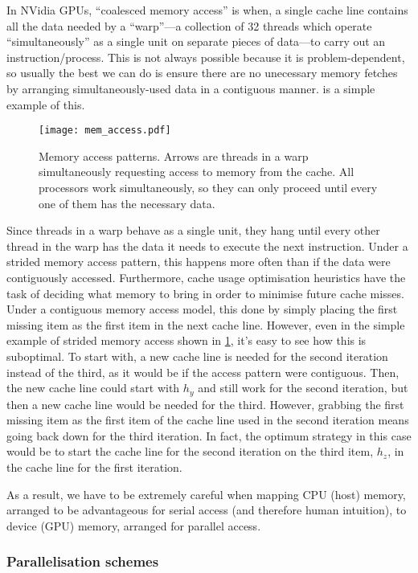 In NVidia GPUs, ``coalesced memory access'' is when, a single cache line contains all the data needed by a ``warp''---a collection of 32 threads which operate ``simultaneously'' as a single unit on separate pieces of data---to carry out an instruction/process. This is not always possible because it is problem-dependent, so usually the best we can do is ensure there are no unecessary memory fetches by arranging simultaneously-used data in a contiguous manner.  is a simple example of this.
\begin{figure}
  \centering
  \texttt{[image: mem\_access.pdf]}
  \caption[Memory access patterns.]{Memory access patterns. Arrows are threads in a warp simultaneously requesting access to memory from the cache. All processors work simultaneously, so they can only proceed until every one of them has the necessary data.}
  \label{f:mem_access}
\end{figure}

Since threads in a warp behave as a single unit, they hang until every other thread in the warp has the data it needs to execute the next instruction. Under a strided memory access pattern, this happens more often than if the data were contiguously accessed. Furthermore, cache usage optimisation heuristics have the task of deciding what memory to bring in order to minimise future cache misses. Under a contiguous memory access model, this done by simply placing the first missing item as the first item in the next cache line. However, even in the simple example of strided memory access shown in \cref{f:mem_access}, it's easy to see how this is suboptimal. To start with, a new cache line is needed for the second iteration instead of the third, as it would be if the access pattern were contiguous. Then, the new cache line could start with $h_y$ and still work for the second iteration, but then a new cache line would be needed for the third. However, grabbing the first missing item as the first item of the cache line used in the second iteration means going back down for the third iteration. In fact, the optimum strategy in this case would be to start the cache line for the second iteration on the third item, $h_z$, in the cache line for the first iteration.

As a result, we have to be extremely careful when mapping CPU (host) memory, arranged to be advantageous for serial access (and therefore human intuition), to device (GPU) memory, arranged for parallel access.

\subsubsection{Parallelisation schemes}

